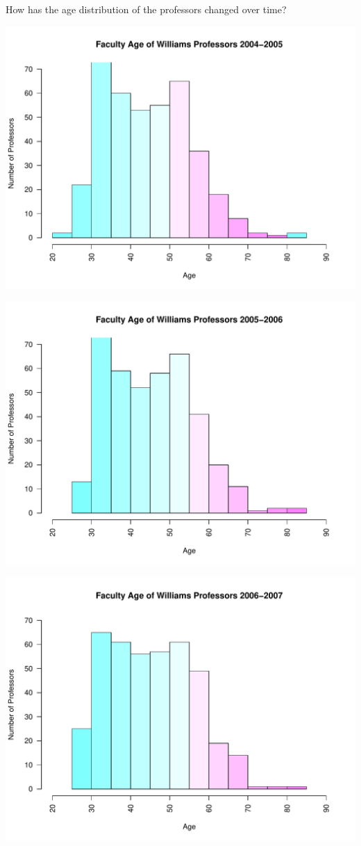 \documentclass[12pt,a4paper]{article}\usepackage[]{graphicx}\usepackage[]{color}
\makeatletter
\def\maxwidth{ %
  \ifdim\Gin@nat@width>\linewidth
    \linewidth
  \else
    \Gin@nat@width
  \fi
}
\newenvironment{knitrout}{}{} %
\theoremstyle{definition}
\makeatother
\begin{document}
\bigskip
How has the age distribution of the professors changed over time?

\begin{knitrout}
\color{fgcolor}
\includegraphics[width=\maxwidth]{figure/unnamed-chunk-9-1} 

\includegraphics[width=\maxwidth]{figure/unnamed-chunk-9-2} 

\includegraphics[width=\maxwidth]{figure/unnamed-chunk-9-3} 


\end{knitrout}
\end{document}
